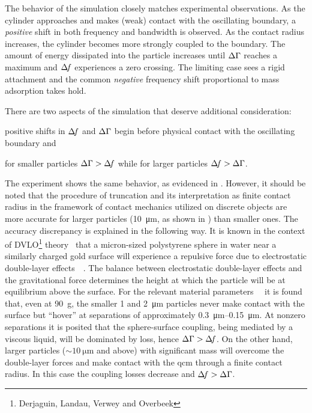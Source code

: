 The behavior of the simulation closely matches
experimental observations.  As the cylinder approaches and makes (weak)
contact with the oscillating boundary, a \textit{positive} shift in both
frequency and bandwidth is observed.  As the contact radius increases, the
cylinder becomes more strongly coupled to the boundary. The amount of energy
dissipated into the particle increases until $\Delta\Gamma$ reaches a maximum and
$\Delta\!f$ experiences a zero crossing.  The limiting case sees a rigid
attachment and the common \textit{negative} frequency shift proportional to
mass adsorption takes hold.

There are two aspects of the simulation that deserve additional
consideration:%
\begin{inparaenum}[(1)]
  \item positive shifts in $\Delta\!f$ and $\Delta\Gamma$ begin
  before physical contact with the oscillating boundary and
  \item for smaller particles $\Delta\Gamma>\Delta\!f$ while for
  larger particles $\Delta\!f>\Delta\Gamma$.
\end{inparaenum}

The experiment shows the same behavior, as evidenced in
.  However, it should be noted that the procedure of
truncation and its interpretation as finite contact radius in the framework
of contact mechanics utilized on discrete objects are more accurate for
larger particles (\SI{10}{\micro\meter}, as shown in
) than smaller ones.  The accuracy discrepancy is
explained in the following way.  It is known in the context of
DVLO\footnote{Derjaguin, Landau, Verwey and Overbeek}
theory~\cite{israelachvili2011intermolecular} that a micron-sized
polystyrene sphere in water near a similarly charged gold surface will
experience a repulsive force due to electrostatic double-layer
effects~\cite{alexander1987hydrodynamic}~\cite{flicker1993quantifying}.
The balance between electrostatic double-layer effects and the
gravitational force determines the height at which the particle will be at
equilibrium above the surface.  For the relevant material
parameters~\cite{israelachvili2011intermolecular}~\cite{sharma1992factors}
it is found that, even at \SI{90}{g}, the smaller \num{1} and
\SI{2}{\micro\meter} particles never make contact with the surface but
``hover'' at separations of approximately
\SIrange{0.3}{0.15}{\micro\meter}.  At nonzero separations it is posited
that the sphere-surface coupling, being mediated by a viscous liquid, will
be dominated by loss, hence $\Delta\Gamma>\Delta\!f$.  On the other hand, larger particles
($\sim\SI{10}{\micro\meter}$ and above) with significant mass will overcome
the double-layer forces and make contact with the \gls{qcm} through a finite
contact radius.  In this case the coupling losses decrease and $\Delta\!f>\Delta\Gamma$.

